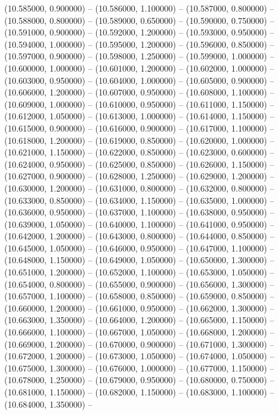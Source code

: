 (10.585000, 0.900000) -- 
(10.586000, 1.100000) -- 
(10.587000, 0.800000) -- 
(10.588000, 0.800000) -- 
(10.589000, 0.650000) -- 
(10.590000, 0.750000) -- 
(10.591000, 0.900000) -- 
(10.592000, 1.200000) -- 
(10.593000, 0.950000) -- 
(10.594000, 1.000000) -- 
(10.595000, 1.200000) -- 
(10.596000, 0.850000) -- 
(10.597000, 0.900000) -- 
(10.598000, 1.250000) -- 
(10.599000, 1.000000) -- 
(10.600000, 1.000000) -- 
(10.601000, 1.200000) -- 
(10.602000, 1.000000) -- 
(10.603000, 0.950000) -- 
(10.604000, 1.000000) -- 
(10.605000, 0.900000) -- 
(10.606000, 1.200000) -- 
(10.607000, 0.950000) -- 
(10.608000, 1.100000) -- 
(10.609000, 1.000000) -- 
(10.610000, 0.950000) -- 
(10.611000, 1.150000) -- 
(10.612000, 1.050000) -- 
(10.613000, 1.000000) -- 
(10.614000, 1.150000) -- 
(10.615000, 0.900000) -- 
(10.616000, 0.900000) -- 
(10.617000, 1.100000) -- 
(10.618000, 1.200000) -- 
(10.619000, 0.850000) -- 
(10.620000, 1.000000) -- 
(10.621000, 1.150000) -- 
(10.622000, 0.850000) -- 
(10.623000, 0.600000) -- 
(10.624000, 0.950000) -- 
(10.625000, 0.850000) -- 
(10.626000, 1.150000) -- 
(10.627000, 0.900000) -- 
(10.628000, 1.250000) -- 
(10.629000, 1.200000) -- 
(10.630000, 1.200000) -- 
(10.631000, 0.800000) -- 
(10.632000, 0.800000) -- 
(10.633000, 0.850000) -- 
(10.634000, 1.150000) -- 
(10.635000, 1.000000) -- 
(10.636000, 0.950000) -- 
(10.637000, 1.100000) -- 
(10.638000, 0.950000) -- 
(10.639000, 1.050000) -- 
(10.640000, 1.100000) -- 
(10.641000, 0.950000) -- 
(10.642000, 1.200000) -- 
(10.643000, 0.800000) -- 
(10.644000, 0.850000) -- 
(10.645000, 1.050000) -- 
(10.646000, 0.950000) -- 
(10.647000, 1.100000) -- 
(10.648000, 1.150000) -- 
(10.649000, 1.050000) -- 
(10.650000, 1.300000) -- 
(10.651000, 1.200000) -- 
(10.652000, 1.100000) -- 
(10.653000, 1.050000) -- 
(10.654000, 0.800000) -- 
(10.655000, 0.900000) -- 
(10.656000, 1.300000) -- 
(10.657000, 1.100000) -- 
(10.658000, 0.850000) -- 
(10.659000, 0.850000) -- 
(10.660000, 1.200000) -- 
(10.661000, 0.950000) -- 
(10.662000, 1.300000) -- 
(10.663000, 1.350000) -- 
(10.664000, 1.200000) -- 
(10.665000, 1.150000) -- 
(10.666000, 1.100000) -- 
(10.667000, 1.050000) -- 
(10.668000, 1.200000) -- 
(10.669000, 1.200000) -- 
(10.670000, 0.900000) -- 
(10.671000, 1.300000) -- 
(10.672000, 1.200000) -- 
(10.673000, 1.050000) -- 
(10.674000, 1.050000) -- 
(10.675000, 1.300000) -- 
(10.676000, 1.000000) -- 
(10.677000, 1.150000) -- 
(10.678000, 1.250000) -- 
(10.679000, 0.950000) -- 
(10.680000, 0.750000) -- 
(10.681000, 1.150000) -- 
(10.682000, 1.150000) -- 
(10.683000, 1.100000) -- 
(10.684000, 1.350000) -- 
